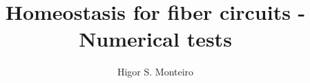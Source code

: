 \documentclass[12pt]{article}
\begin{document}
\title{Homeostasis for fiber circuits - Numerical tests}
\author{Higor S. Monteiro}

\maketitle

\tableofcontents
\newpage




%

%



\end{document}
